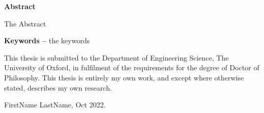 
\begin{center}
{\LARGE\bfseries
Abstract}
\end{center}

The Abstract

\vspace{5mm}
\noindent
{\small 
\textbf{Keywords --} the keywords
}
\clearpage






\noindent This thesis is submitted to the Department of Engineering Science,
The University of Oxford, in fulfilment of the requirements for the degree of
Doctor of Philosophy. This thesis is entirely my own work, and except
where otherwise stated, describes my own research.
\begin{FlushRight}
FirstName LastName, Oct 2022.
\end{FlushRight}

\clearpage
